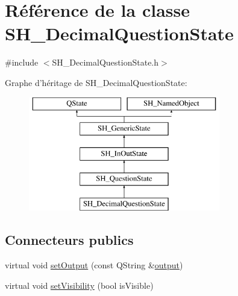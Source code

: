 \hypertarget{classSH__DecimalQuestionState}{\section{Référence de la classe S\-H\-\_\-\-Decimal\-Question\-State}
\label{classSH__DecimalQuestionState}
}


{\ttfamily \#include $<$S\-H\-\_\-\-Decimal\-Question\-State.\-h$>$}

Graphe d'héritage de S\-H\-\_\-\-Decimal\-Question\-State\-:\begin{figure}[H]
\begin{center}
\leavevmode
\includegraphics[height=5.000000cm]{classSH__DecimalQuestionState}
\end{center}
\end{figure}
\subsection*{Connecteurs publics}
\begin{DoxyCompactItemize}
\item 
virtual void \hyperlink{classSH__InOutState_af611c84134e262739cd834797b315c80}{set\-Output} (const Q\-String \&\hyperlink{classSH__InOutState_a17ed7eaf5e3ed5af80a4f9fe65d5bfd9}{output})
\item 
virtual void \hyperlink{classSH__InOutState_a7fdfaa6f600f0ac4a96f238a038ba9ad}{set\-Visibility} (bool is\-Visible)
\end{DoxyCompactItemize}
